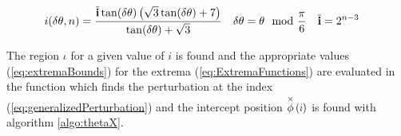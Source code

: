 
\begin{align*}
 i(\delta\theta, n) &= \frac{\overline{\mathbf{i}} \tan (\delta \theta ) \left(\sqrt{3} \tan (\delta \theta )+7\right)}{\tan (\delta \theta )+\sqrt{3}} &
  \delta\theta &= \theta \mod{\frac{\pi}{6} } &
  \overline{\mathbf{i}} & = 2^{n-3} 
\end{align*}

The region $\iota$ for a given value of $i$ is found and the appropriate values (\ref{eq:extremaBounds}) for the extrema (\ref{eq:ExtremaFunctions}) are evaluated in the function which finds the perturbation at the index (\ref{eq:generalizedPerturbation}) and the intercept position $\thetaX{i}$ is found with algorithm \ref{algo:thetaX}.

